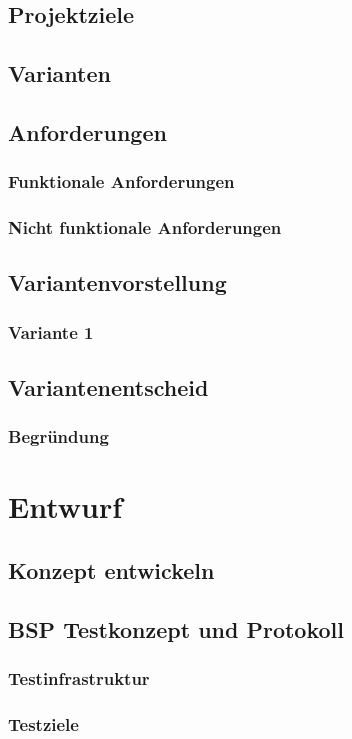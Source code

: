 \documentclass{report}
\begin{document}
\section{Projektziele}
\section{Varianten}
\section{Anforderungen}
\subsection{Funktionale Anforderungen}
\subsection{Nicht funktionale Anforderungen}
\section{Variantenvorstellung}
\subsection{Variante 1}
\section{Variantenentscheid}
\subsection{Begründung}

\chapter{Entwurf}
\section{Konzept entwickeln}
\section{BSP Testkonzept und Protokoll}
\subsection{Testinfrastruktur}
\subsection{Testziele}
\end{document}
